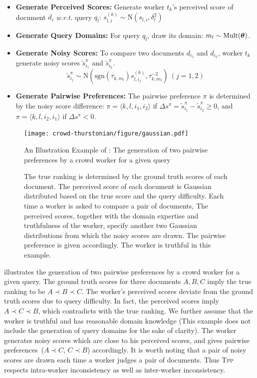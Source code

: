 \begin{itemize}
\item \textbf{Generate Perceived Scores:} Generate worker $t_k$'s perceived
  score of document $d_i$ \emph{w.r.t.} query $q_l$:  $s_{l,i}^{(k)} \sim
  \mathrm{N}(s_{l,i}, \delta_l^2)$
\item \textbf{Generate Query Domains:} For query $q_l$, draw its domain: $m_l
  \sim \mathrm{Mult}(\boldsymbol{\mathbf{\theta}})$.
\item \textbf{Generate Noisy Scores:} To compare two documents $d_{i_1}$ and
  $d_{i_2}$, worker $t_k$ generate noisy scores $\tilde{s}_{i_1}^{\pi}$ and
  $\tilde{s}_{i_2}^{\pi}$.
    \begin{equation}
    \tilde{s}_{i_j}^{\pi} \sim \mathrm{N}(
                        \mathrm{sgn}(\tau_{k,m_l}) s_{l,i_j}^{(k)},
                        \tau_{k,m_l}^{-2}) ~(j=1,2)
                        \label{eq::tpp_ns_gen}
    \end{equation}
\item \textbf{Generate Pairwise Preferences:} The pairwise preference $\pi$ is
  determined by the noisy score difference: $\pi=\langle k, l, i_1, i_2 \rangle$
  if $\Delta s^\pi  = \tilde{s}_{i_1}^{\pi} - \tilde{s}_{i_2}^{\pi}  \geq 0$,
  and $\pi=\langle k, l, i_2, i_1 \rangle$ if $\Delta s^\pi < 0$.
\end{itemize}

\begin{figure}[h!]
  \hspace{2.5cm}
		\texttt{[image: crowd-thurstonian/figure/gaussian.pdf]}
    \caption{An Illustration Example of \tpp{}: The generation of two pairwise
    preferences by a crowd worker for a given query} \label{fig::gaussian}
    \caption*{The true ranking is determined by the  ground truth scores of each
      document. The perceived score of each document is Gaussian distributed
      based on the true score and the query difficulty. Each time a worker is
      asked to compare a pair of documents, The perceived scores, together with
      the domain expertise and truthfulness of the worker, specify another two
      Gaussian distributions from which the noisy scores are drawn. The pairwise
      preference is given accordingly. The worker is truthful in this example.}
\end{figure}

 illustrates the generation of two pairwise
preferences by a crowd worker for a given query. The ground truth scores for
three documents $A,B,C$ imply the true ranking to be $A \prec B \prec C$. The
worker's perceived scores deviate from the ground truth scores due to query
difficulty. In fact, the perceived scores imply $A \prec C \prec B$, which
contradicts with the true ranking.  We further assume that the worker is
truthful and has reasonable domain knowledge (This example does not include the
generation of query domains for the sake of clarity). The worker generates noisy
scores which are close to his perceived scores, and gives pairwise
preferences~($A \prec C$, $C \prec B$) accordingly.  It is worth noting that a
pair of noisy scores are drawn each time a worker judges a pair of documents.
Thus \textsc{Tpp} respects {intra-worker inconsistency} as well as {inter-worker
inconsistency}.

